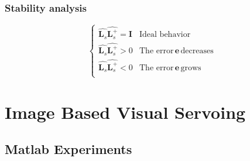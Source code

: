 \documentclass[a4paper,12pt]{article}
\begin{document}
\subsubsection{Stability analysis}
\begin{equation}
	\begin{cases}
		\widehat{\mathbf{L}_s}\widehat{\mathbf{L}_s^+} = \mathbf{I} 
			& \text{Ideal behavior} \\
		\widehat{\mathbf{L}_s}\widehat{\mathbf{L}_s^+} >0 & 
			\text{The error}\, \mathbf{e}\, \text{decreases} \\
		\widehat{\mathbf{L}_s}\widehat{\mathbf{L}_s^+} < 0 & 
			\text{The error}\, \mathbf{e}\, \text{grows} \\
	\end{cases}
\end{equation}


\section{Image Based Visual Servoing}

\subsection{Matlab Experiments}
\end{document}
